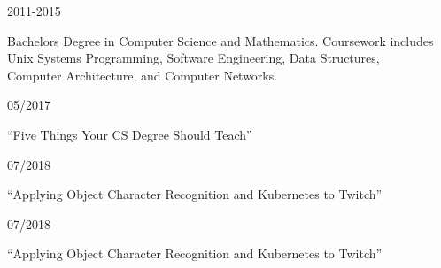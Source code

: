 \documentclass[12pt]{article} %
\begin{document}

\begin{description}
\squish
{}
           {}
           {2011-2015}

Bachelors Degree in Computer Science and Mathematics. Coursework includes \\
Unix Systems Programming, Software Engineering, Data Structures, \\
Computer Architecture, and Computer Networks.

\end{description}


\begin{description}
\squish

           {}
           {05/2017}

    ``Five Things Your CS Degree Should Teach''

           {}
           {07/2018}

    ``Applying Object Character Recognition and Kubernetes to Twitch''

           {}
           {07/2018}

    ``Applying Object Character Recognition and Kubernetes to Twitch''

\end{description}
\end{document}
